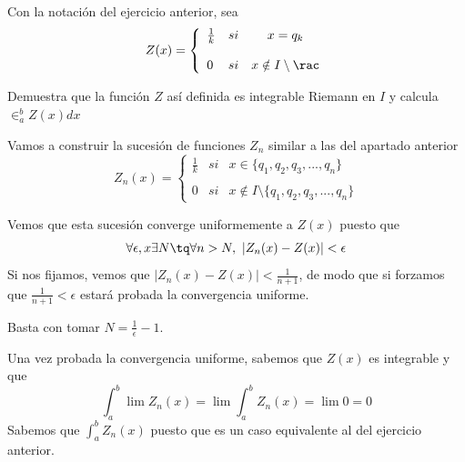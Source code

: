\begin{problem}[4]
Con la notación del ejercicio anterior, sea
\[Z(x)= \left\{ \begin{array}{lcc}
             \frac{1}{k} &   si  & x = q_k \\
             \\ 0 &  si  & x \notin I \setminus \rac
             \end{array}
   \right.\]

Demuestra que la función $Z$ así definida es integrable Riemann en $I$ y calcula $\in_a^bZ(x)dx$

\solution

Vamos a construir la sucesión de funciones $Z_n$ similar a las del apartado anterior
\[Z_n(x)= \left\{ \begin{array}{lcc}
             \frac{1}{k} &   si  & x \in \{q_1,q_2,q_3,...,q_n\} \\
             \\ 0 &  si  & x \notin I \setminus \{q_1,q_2,q_3,...,q_n\}
             \end{array}
   \right.\]

Vemos que esta sucesión converge uniformemente a $Z(x)$ puesto que
\[\forall \epsilon, x \exists N  \tq \forall n > N, \ |Z_n(x)-Z(x)|<\epsilon\]
Si nos fijamos, vemos que $|Z_n(x)-Z(x)|<\frac{1}{n+1}$, de modo que si forzamos que $\frac{1}{n+1}<\epsilon$ estará probada la convergencia uniforme.

Basta con tomar $N=\frac{1}{\epsilon} -1$.

Una vez probada la convergencia uniforme, sabemos que $Z(x)$ es integrable y que
\[\int_a^b \lim Z_n(x) =\lim \int_a^b Z_n(x) = \lim 0 = 0\]
Sabemos que $\int_a^b Z_n(x)$ puesto que es un caso equivalente al del ejercicio anterior.
\end{problem}

